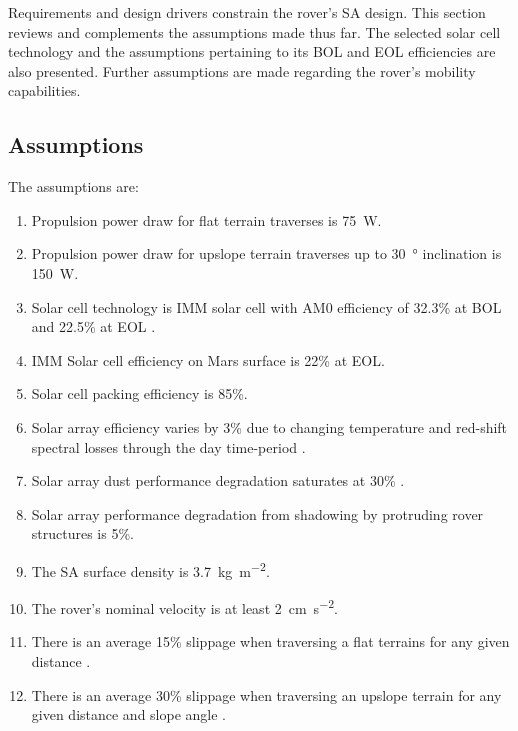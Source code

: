 Requirements and design drivers constrain the rover's \ac{SA} design. This section reviews and complements the assumptions made thus far. The selected solar cell technology and the assumptions pertaining to its \ac{BOL} and \ac{EOL} efficiencies are also presented. Further assumptions are made regarding the rover's mobility capabilities.


\subsection{Assumptions}
\label{sec:RequirementsAndDesignDrivers:Assumptions}
The assumptions are:

\begin{enumerate}[label=\textbf{\textcolor{BulletBlue}{A-\arabic*}}]
    \item Propulsion power draw for flat terrain traverses is \SI{75}{\watt}.
    \item Propulsion power draw for upslope terrain traverses up to \SI{30}{\degree} inclination is \SI{150}{\watt}.
    \item Solar cell technology is \ac{IMM} solar cell with AM0 efficiency of 32.3\% at \ac{BOL} and 22.5\% at \ac{EOL} .
    \item \label{itm:ass:solar_cell_efficiency} \ac{IMM} Solar cell efficiency on Mars surface is 22\% at \ac{EOL}.
    \item \label{itm:ass:packing_efficiency} Solar cell packing efficiency is 85\%.
    \item \label{itm:ass:red_shifts} Solar array efficiency varies by 3\% due to changing temperature and red-shift spectral losses through the day time-period .
    \item \label{itm:ass:dust_deposition_saturation} Solar array dust performance degradation saturates at 30\% .
    \item \label{itm:ass:protruding_shadowing} Solar array performance degradation from shadowing by protruding rover structures is 5\%.
    \item \label{itm:ass:sa_surface_density} The \ac{SA} surface density is \SI{3.7}{kg.m^{-2}}.
    \item The rover's nominal velocity is at least \SI{2}{cm.s^{-2}}.
    \item There is an average 15\% slippage when traversing a flat terrains for any given distance .
    \item There is an average 30\% slippage when traversing an upslope terrain for any given distance and slope angle .
\end{enumerate}

